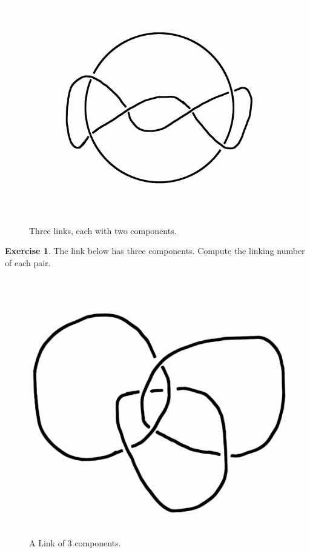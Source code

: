 \documentclass[12pt,letterpaper]{article}
\theoremstyle{definition}
\newtheorem{exercise}[question]{Exercise}
\begin{document}
\begin{figure}[h]
\begin{subfigure}{.3\textwidth}
    \end{subfigure}
    \quad
    \begin{subfigure}{.3\textwidth}
        \centering
        \includegraphics[width=\textwidth]{knotpics/ex3.png}
    \end{subfigure}
    \caption{Three links, each with two components.}
\end{figure}
    
\begin{exercise}
The link below has three components.
Compute the linking number of each pair.
\end{exercise}

\begin{figure}[h]
    \centering
    \includegraphics[width=.5\textwidth]{knotpics/hitchmantriple.png}
    \caption{A Link of 3 components.}
\end{figure}
\end{document}
